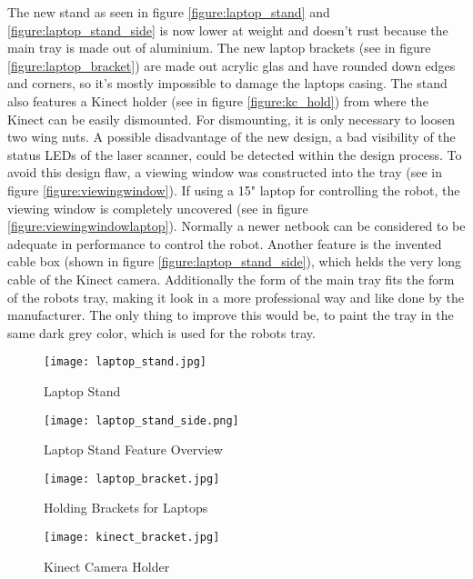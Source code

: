 The new stand as seen in figure \vref{figure:laptop_stand} and \vref{figure:laptop_stand_side} is now lower at
weight and doesn't rust because the main tray is made out of aluminium. The new laptop brackets 
(see in figure \vref{figure:laptop_bracket}) are made out acrylic glas and have rounded down edges and corners, 
so it's mostly impossible to damage the laptops casing. The stand also features a Kinect holder 
(see in figure \vref{figure:kc_hold}) from where the Kinect can be easily dismounted. For dismounting, 
it is only necessary to loosen two wing nuts. A possible disadvantage of the new design, a bad visibility of
the status LEDs of the laser scanner, could be detected within the design process. 
To avoid this design flaw, a viewing window was constructed into the tray (see in figure \vref{figure:viewingwindow}). 
If using a 15" laptop for controlling the robot, the viewing window is completely uncovered 
(see in figure \vref{figure:viewingwindowlaptop}). Normally a newer netbook can be considered to be 
adequate in performance to control the robot. Another feature is the invented cable box 
(shown in figure \vref{figure:laptop_stand_side}), which helds the very long cable of the Kinect camera. 
Additionally the form of the main tray fits the form of the robots tray, making it look in a more professional 
way and like done by the manufacturer. The only thing to improve this would be, to paint the tray in the 
same dark grey color, which is used for the robots tray.

\begin{figure}[htp]
\begin{center}
  \texttt{[image: laptop\_stand.jpg]}
  \caption{Laptop Stand}
  \label{figure:laptop_stand}
\end{center}
\end{figure}
\begin{figure}[htp]
\begin{center}
  \texttt{[image: laptop\_stand\_side.png]}
  \caption{Laptop Stand Feature Overview}
  \label{figure:laptop_stand_side}
\end{center}
\end{figure}


\begin{figure}[htp]
\begin{center}
  \texttt{[image: laptop\_bracket.jpg]}
  \caption{Holding Brackets for Laptops}
  \label{figure:laptop_bracket}
\end{center}
\end{figure}
\begin{figure}[htp]
\begin{center}
  \texttt{[image: kinect\_bracket.jpg]}
  \caption{Kinect Camera Holder}
  \label{figure:kc_hold}
\end{center}
\end{figure}

